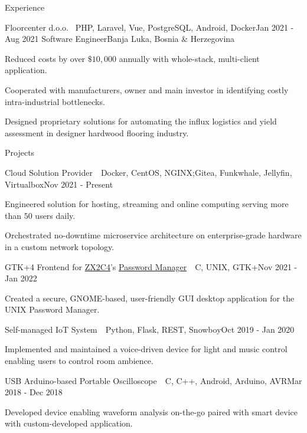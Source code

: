 \documentclass{resume}
\begin{document}
\begin{rSection}{Experience}
\begin{rSubsection}
        {Floorcenter d.o.o. \mid\ \textnormal{PHP, Laravel, Vue, PostgreSQL,
        Android, Docker}}{Jan 2021 - Aug 2021}
        {Software Engineer}{Banja Luka, Bosnia \& Herzegovina}
        \item Reduced costs by over $\$10,000$ annually with whole-stack,
            multi-client application.
        \item Cooperated with manufacturers, owner and main investor in
            identifying costly intra-industrial bottlenecks.
        \item Designed proprietary solutions for automating the influx logistics
            and yield assessment in designer hardwood flooring industry.
    \end{rSubsection}
\end{rSection}


\begin{rSection}{Projects}
    \begin{rSubsection}{Cloud Solution Provider\ \mid\ \textnormal{Docker,
        CentOS, NGINX;\@ Gitea, Funkwhale, Jellyfin, Virtualbox}}{Nov 2021 - Present}{}{}
        \item Engineered solution for hosting, streaming and online computing
            serving more than $50$ users daily.
        \item Orchestrated no-downtime microservice architecture on
            enterprise-grade hardware in a custom network topology.
    \end{rSubsection}

    \begin{rSubsection}{GTK+4 Frontend for \href{zx2c4.com}{ZX2C4}'s
        \href{https://www.passwordstore.org/}{Password Manager}\ \mid\
        \textnormal{C, UNIX, GTK+}}{Nov 2021 - Jan 2022}{}{}
        \item Created a secure, GNOME-based, user-friendly GUI desktop
            application for the UNIX Password Manager.
    \end{rSubsection}

    \begin{rSubsection}{Self-managed IoT System\ \mid\ \textnormal{Python,
        Flask, REST, Snowboy}}{Oct 2019 - Jan 2020}{}{}
        \item Implemented and maintained a voice-driven device for light and
            music control enabling users to control room ambience.
    \end{rSubsection}

    \begin{rSubsection}{USB Arduino-based Portable Oscilloscope\ \mid\
        \textnormal{C, C++, Android, Arduino, AVR}}{Mar 2018 - Dec 2018}{}{}
        \item Developed device enabling waveform analysis on-the-go paired
            with smart device with custom-developed application.
    \end{rSubsection}
\end{rSection}
\end{document}

